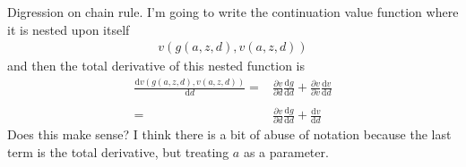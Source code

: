 \documentclass[12pt,pdftex]{article}
\begin{document}
\begin{onehalfspacing}
\hrulefill

Digression on chain rule. I'm going to write the continuation value function where it is nested upon itself
\begin{align}
v(g(a,z,d), v(a,z,d))
\end{align}
and then the total derivative of this nested function is
\begin{align}
\frac{\mathrm{d} v(g(a,z,d), v(a,z,d))}{\mathrm{d} d} =& \frac{\partial v}{\partial d}\frac{\mathrm{d}g}{\mathrm{d}d} +  \frac{\partial v}{\partial v}\frac{\mathrm{d}v}{\mathrm{d}d} \\
\nonumber \\ 
 =& \frac{\partial v}{\partial d}\frac{\mathrm{d}g}{\mathrm{d}d} +  \frac{\mathrm{d}v}{\mathrm{d}d}
\end{align}
Does this make sense? I think there is a bit of abuse of notation because the last term is the total derivative, but treating $a$ as a parameter. 

\hrulefill




\end{onehalfspacing}
\end{document}
